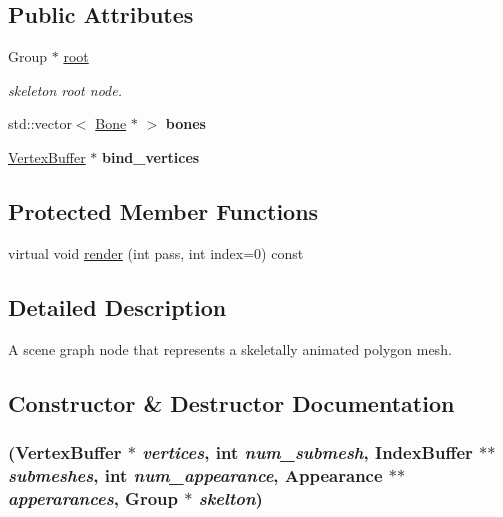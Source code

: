 \subsection*{Public Attributes}
\begin{CompactItemize}
\item 
\hypertarget{classm3g_1_1SkinnedMesh_e7632c37fb719b0740846ec342b2d6bf}{
Group $\ast$ \hyperlink{classm3g_1_1SkinnedMesh_e7632c37fb719b0740846ec342b2d6bf}{root}}
\label{classm3g_1_1SkinnedMesh_e7632c37fb719b0740846ec342b2d6bf}

\begin{CompactList}\small\item\em skeleton root node. \item\end{CompactList}\item 
\hypertarget{classm3g_1_1SkinnedMesh_3bf107d6a2cb389a4887fdaa8aaebee6}{
std::vector$<$ \hyperlink{classm3g_1_1Bone}{Bone} $\ast$ $>$ \textbf{bones}}
\label{classm3g_1_1SkinnedMesh_3bf107d6a2cb389a4887fdaa8aaebee6}

\item 
\hypertarget{classm3g_1_1SkinnedMesh_43e75fc18cd8102b1e657fe5620f8f94}{
\hyperlink{classm3g_1_1VertexBuffer}{VertexBuffer} $\ast$ \textbf{bind\_\-vertices}}
\label{classm3g_1_1SkinnedMesh_43e75fc18cd8102b1e657fe5620f8f94}

\end{CompactItemize}
\subsection*{Protected Member Functions}
\begin{CompactItemize}
\item 
virtual void \hyperlink{classm3g_1_1SkinnedMesh_1efcb1973989d9963d5bd6d03065d389}{render} (int pass, int index=0) const 
\end{CompactItemize}


\subsection{Detailed Description}
A scene graph node that represents a skeletally animated polygon mesh. 

\subsection{Constructor \& Destructor Documentation}
\hypertarget{classm3g_1_1SkinnedMesh_9ee04e655db4e2a95a0ab55d8ebb45c8}{
\subsubsection[{SkinnedMesh}]{ ({\bf VertexBuffer} $\ast$ {\em vertices}, \/  int {\em num\_\-submesh}, \/  {\bf IndexBuffer} $\ast$$\ast$ {\em submeshes}, \/  int {\em num\_\-appearance}, \/  {\bf Appearance} $\ast$$\ast$ {\em apperarances}, \/  Group $\ast$ {\em skelton})}}
\label{classm3g_1_1SkinnedMesh_9ee04e655db4e2a95a0ab55d8ebb45c8}


